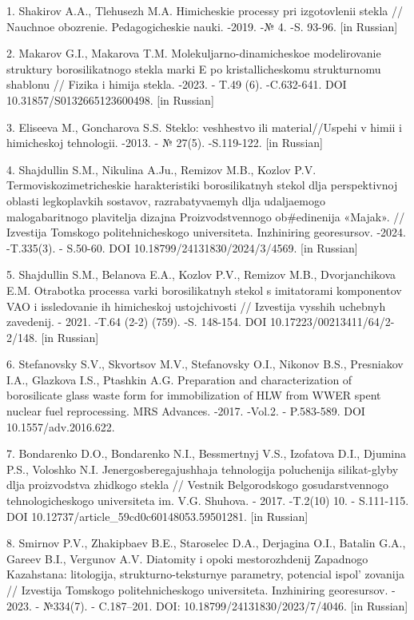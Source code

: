 \begin{refs}
1. Shakirov A.A., Tlehusezh M.A. Himicheskie processy pri izgotovlenii
stekla // Nauchnoe obozrenie. Pedagogicheskie nauki. -2019. -№ 4. -S.
93-96. {[}in Russian{]}

2. Makarov G.I., Makarova T.M. Molekuljarno-dinamicheskoe modelirovanie
struktury borosilikatnogo stekla marki E po kristallicheskomu
strukturnomu shablonu // Fizika i himija stekla. -2023. - T.49 (6).
-C.632-641. DOI 10.31857/S0132665123600498. {[}in Russian{]}

3. Eliseeva M., Goncharova S.S. Steklo: veshhestvo ili material//Uspehi
v himii i himicheskoj tehnologii. -2013. - № 27(5). -S.119-122. {[}in
Russian{]}

4. Shajdullin S.M., Nikulina A.Ju., Remizov M.B., Kozlov P.V.
Termoviskozimetricheskie harakteristiki borosilikatnyh stekol dlja
perspektivnoj oblasti legkoplavkih sostavov, razrabatyvaemyh dlja
udaljaemogo malogabaritnogo plavitelja dizajna Proizvodstvennogo
ob\#edinenija «Majak». // Izvestija Tomskogo politehnicheskogo
universiteta. Inzhiniring georesursov. -2024. -T.335(3). - S.50-60. DOI
10.18799/24131830/2024/3/4569. {[}in Russian{]}

5. Shajdullin S.M., Belanova E.A., Kozlov P.V., Remizov M.B.,
Dvorjanchikova E.M. Otrabotka processa varki borosilikatnyh stekol s
imitatorami komponentov VAO i issledovanie ih himicheskoj ustojchivosti
// Izvestija vysshih uchebnyh zavedenij. - 2021. -T.64 (2-2) (759). -S.
148-154. DOI 10.17223/00213411/64/2-2/148. {[}in Russian{]}

6. Stefanovsky S.V., Skvortsov M.V., Stefanovsky O.I., Nikonov B.S.,
Presniakov I.A., Glazkova I.S., Ptashkin A.G. Preparation and
characterization of borosilicate glass waste form for immobilization of
HLW from WWER spent nuclear fuel reprocessing. MRS Advances. -2017.
-Vol.2. - P.583-589. DOI 10.1557/adv.2016.622.

7. Bondarenko D.O., Bondarenko N.I., Bessmertnyj V.S., Izofatova D.I.,
Djumina P.S., Voloshko N.I. Jenergosberegajushhaja tehnologija
poluchenija silikat-glyby dlja proizvodstva zhidkogo stekla // Vestnik
Belgorodskogo gosudarstvennogo tehnologicheskogo universiteta im. V.G.
Shuhova. - 2017. -T.2(10) 10. - S.111-115.
DOI 10.12737/article\_59cd0c60148053.59501281. {[}in Russian{]}

8. Smirnov P.V., Zhakipbaev B.E., Staroselec D.A., Derjagina O.I.,
Batalin G.A., Gareev B.I., Vergunov A.V. Diatomity i opoki
mestorozhdenij Zapadnogo Kazahstana: litologija, strukturno-teksturnye
parametry, potencial ispol' zovanija // Izvestija
Tomskogo politehnicheskogo universiteta. Inzhiniring georesursov. -
2023. - №334(7). - C.187--201. DOI: 10.18799/24131830/2023/7/4046.
{[}in Russian{]}


\end{refs}
